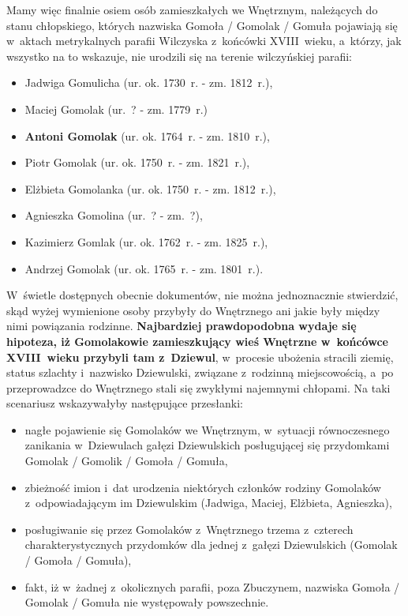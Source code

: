 Mamy więc finalnie osiem osób zamieszkałych we Wnętrznym, należących do stanu 
chłopskiego, których nazwiska Gomoła / Gomolak / Gomuła pojawiają się 
w~aktach metrykalnych parafii Wilczyska z~końcówki XVIII~wieku, a~którzy, jak 
wszystko na to wskazuje, nie urodzili się na terenie wilczyńskiej parafii:

\begin{itemize}
    \item Jadwiga Gomulicha (ur. ok. 1730~r. - zm. 1812~r.),
    \item Maciej Gomolak (ur.~? - zm. 1779~r.)
    \item \textbf{Antoni Gomolak} (ur. ok. 1764~r. - zm. 1810~r.),
    \item Piotr Gomolak (ur. ok. 1750~r. - zm. 1821~r.),
    \item Elżbieta Gomolanka (ur. ok. 1750~r. - zm. 1812~r.),
    \item Agnieszka Gomolina (ur.~? - zm.~?),
    \item Kazimierz Gomlak (ur. ok. 1762~r. - zm. 1825~r.),
    \item Andrzej Gomolak (ur. ok. 1765~r. - zm. 1801~r.). 
  \end{itemize}

W~świetle dostępnych obecnie dokumentów, nie można jednoznacznie stwierdzić, 
skąd wyżej wymienione osoby przybyły do Wnętrznego ani jakie były między nimi 
powiązania rodzinne. \textbf{Najbardziej prawdopodobna wydaje się hipoteza, 
iż Gomolakowie zamieszkujący wieś Wnętrzne w~końcówce XVIII~wieku przybyli 
tam z~Dziewul}, w~procesie ubożenia stracili ziemię, status szlachty 
i~nazwisko Dziewulski, związane z~rodzinną miejscowością, a~po przeprowadzce 
do Wnętrznego stali się zwykłymi najemnymi chłopami. Na taki scenariusz 
wskazywałyby następujące przesłanki:

\begin{itemize}
    \item nagłe pojawienie się Gomolaków we Wnętrznym, w~sytuacji 
    równoczesnego zanikania w~Dziewulach gałęzi Dziewulskich posługującej się 
    przydomkami Gomolak / Gomolik / Gomoła / Gomuła,
    \item zbieżność imion i~dat urodzenia niektórych członków rodziny 
    Gomolaków z~odpowiadającym im Dziewulskim (Jadwiga, Maciej, Elżbieta, 
    Agnieszka),
    \item posługiwanie się przez Gomolaków z~Wnętrznego trzema z~czterech 
    charakterystycznych przydomków dla jednej z~gałęzi Dziewulskich 
    (Gomolak / Gomoła / Gomuła),
    \item fakt, iż w~żadnej z~okolicznych parafii, poza Zbuczynem, nazwiska 
    Gomoła / Gomolak / Gomuła nie występowały powszechnie.
\end{itemize}
 
